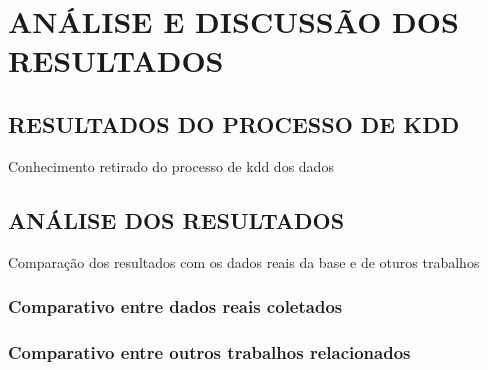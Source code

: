 
\chapter{ANÁLISE E DISCUSSÃO DOS RESULTADOS}
\label{chap:resultados}

\section{RESULTADOS DO PROCESSO DE KDD}
\label{sec:resultadosRegressao}
Conhecimento retirado do processo de kdd dos dados

\section{ANÁLISE DOS RESULTADOS}
\label{sec:analiseResultados}
Comparação dos resultados com os dados reais da base e de oturos trabalhos

\subsection{Comparativo entre dados reais coletados}
\label{subesction:compDadosReais}

\subsection{Comparativo entre outros trabalhos relacionados}
\label{subsection:compOutrosTrabalhos}